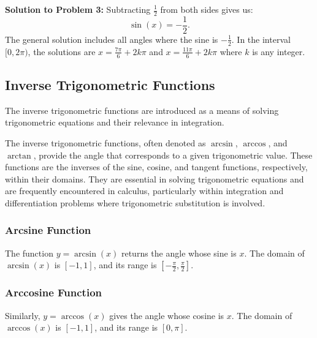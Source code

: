 \documentclass[a4paper,12pt]{book}
\newcounter{problem}
\begin{document}
\textbf{Solution to Problem 3:} Subtracting \( \frac{1}{2} \) from both sides gives us:
\[
\sin(x) = -\frac{1}{2}.
\]
The general solution includes all angles where the sine is \( -\frac{1}{2} \). In the interval \( [0, 2\pi) \), the solutions are \( x = \frac{7\pi}{6} + 2k\pi \) and \( x = \frac{11\pi}{6} + 2k\pi \) where \( k \) is any integer.






\subsection{Inverse Trigonometric Functions}
\label{subsec:inverse_trig_functions}

The inverse trigonometric functions are introduced as a means of solving trigonometric equations and their relevance in integration.

The inverse trigonometric functions, often denoted as $\arcsin$, $\arccos$, and $\arctan$, provide the angle that corresponds to a given trigonometric value. These functions are the inverses of the sine, cosine, and tangent functions, respectively, within their domains. They are essential in solving trigonometric equations and are frequently encountered in calculus, particularly within integration and differentiation problems where trigonometric substitution is involved.

\subsubsection{Arcsine Function}
The function $y = \arcsin(x)$ returns the angle whose sine is $x$. The domain of $\arcsin(x)$ is $[-1,1]$, and its range is $\left[-\frac{\pi}{2}, \frac{\pi}{2}\right]$.

\subsubsection{Arccosine Function}
Similarly, $y = \arccos(x)$ gives the angle whose cosine is $x$. The domain of $\arccos(x)$ is $[-1,1]$, and its range is $[0, \pi]$.
\end{document}
